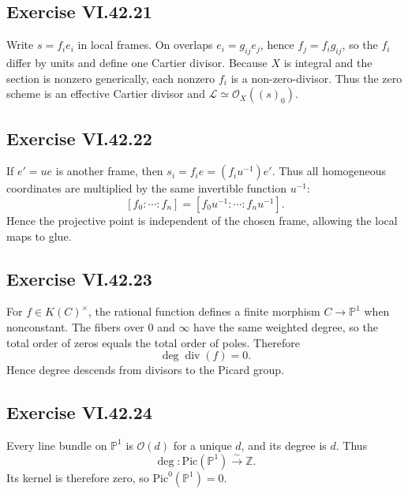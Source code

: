 \subsection*{Exercise VI.42.21}
\begin{solution}
Write \(s=f_ie_i\) in local frames.  On overlaps \(e_i=g_{ij}e_j\), hence \(f_j=f_i g_{ij}\), so the \(f_i\) differ by units and define one Cartier divisor.  Because \(X\) is integral and the section is nonzero generically, each nonzero \(f_i\) is a non-zero-divisor.  Thus the zero scheme is an effective Cartier divisor and \(\mathcal L\simeq\mathcal O_X((s)_0)\).
\end{solution}

\subsection*{Exercise VI.42.22}
\begin{solution}
If \(e'=ue\) is another frame, then \(s_i=f_ie=(f_i u^{-1})e'\).  Thus all homogeneous coordinates are multiplied by the same invertible function \(u^{-1}\):
\[
[f_0:\cdots:f_n]=[f_0u^{-1}:\cdots:f_nu^{-1}].
\]
Hence the projective point is independent of the chosen frame, allowing the local maps to glue.
\end{solution}

\subsection*{Exercise VI.42.23}
\begin{solution}
For \(f\in K(C)^\times\), the rational function defines a finite morphism \(C\to\mathbb P^1\) when nonconstant.  The fibers over \(0\) and \(\infty\) have the same weighted degree, so the total order of zeros equals the total order of poles.  Therefore
\[
\deg\operatorname{div}(f)=0.
\]
Hence degree descends from divisors to the Picard group.
\end{solution}

\subsection*{Exercise VI.42.24}
\begin{solution}
Every line bundle on \(\mathbb P^1\) is \(\mathcal O(d)\) for a unique \(d\), and its degree is \(d\).  Thus
\[
\deg:\mathrm{Pic}(\mathbb P^1)\xrightarrow{\sim}\mathbb Z.
\]
Its kernel is therefore zero, so \(\mathrm{Pic}^0(\mathbb P^1)=0\).
\end{solution}

